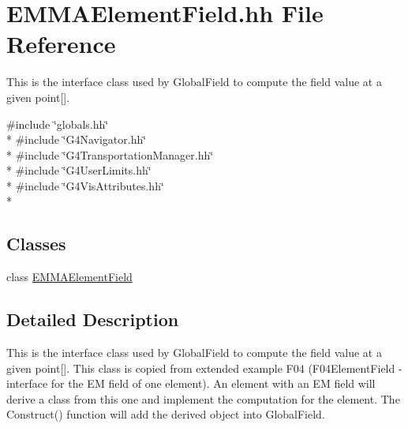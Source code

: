 \hypertarget{EMMAElementField_8hh}{\section{E\-M\-M\-A\-Element\-Field.\-hh File Reference}
\label{EMMAElementField_8hh}
}


This is the interface class used by Global\-Field to compute the field value at a given point\mbox{[}\mbox{]}.  


{\ttfamily \#include \char`\"{}globals.\-hh\char`\"{}}\\*
{\ttfamily \#include \char`\"{}G4\-Navigator.\-hh\char`\"{}}\\*
{\ttfamily \#include \char`\"{}G4\-Transportation\-Manager.\-hh\char`\"{}}\\*
{\ttfamily \#include \char`\"{}G4\-User\-Limits.\-hh\char`\"{}}\\*
{\ttfamily \#include \char`\"{}G4\-Vis\-Attributes.\-hh\char`\"{}}\\*
\subsection*{Classes}
\begin{DoxyCompactItemize}
\item 
class \hyperlink{classEMMAElementField}{E\-M\-M\-A\-Element\-Field}
\end{DoxyCompactItemize}


\subsection{Detailed Description}
This is the interface class used by Global\-Field to compute the field value at a given point\mbox{[}\mbox{]}. This class is copied from extended example F04 (F04\-Element\-Field -\/ interface for the E\-M field of one element). An element with an E\-M field will derive a class from this one and implement the computation for the element. The Construct() function will add the derived object into Global\-Field. 